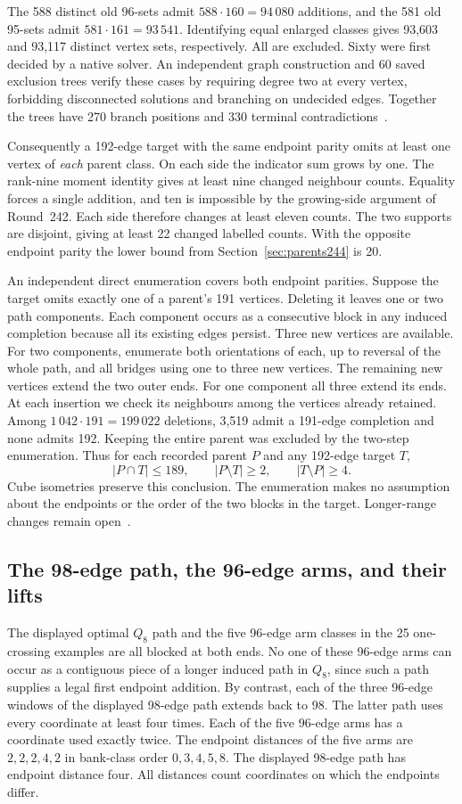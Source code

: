\documentclass[11pt,a4paper]{article}
\theoremstyle{definition}
\theoremstyle{remark}
\begin{document}
The 588 distinct old 96-sets admit $588\cdot160=94\,080$ additions,
and the 581 old 95-sets admit $581\cdot161=93\,541$. Identifying equal
enlarged classes gives 93,603 and 93,117 distinct vertex sets,
respectively. All are excluded. Sixty were first decided by a native
solver. An independent graph construction and 60 saved exclusion
trees verify these cases by requiring degree two at every vertex,
forbidding disconnected solutions and branching on undecided edges.
Together the trees have 270 branch positions and 330 terminal
contradictions~\cite{free245}.

Consequently a 192-edge target with the same endpoint parity omits
at least one vertex of \emph{each} parent class. On each side the
indicator sum grows by one. The rank-nine moment identity gives at
least nine changed neighbour counts. Equality forces a single
addition, and ten is impossible by the growing-side argument of
Round~242. Each side therefore changes at least eleven counts. The
two supports are disjoint, giving at least 22 changed labelled
counts. With the opposite endpoint parity the lower bound from
Section~\ref{sec:parents244} is 20.

An independent direct enumeration covers both endpoint parities.
Suppose the target omits exactly one of a parent's 191 vertices.
Deleting it leaves one or two path components. Each component occurs
as a consecutive block in any induced completion because all its
existing edges persist. Three new vertices are available. For two
components, enumerate both orientations of each, up to reversal of
the whole path, and all bridges using one to three new vertices.
The remaining new vertices extend the two outer ends. For one component
all three extend its ends. At each insertion we check its neighbours
among the vertices already retained. Among $1\,042\cdot191=199\,022$
deletions, 3,519 admit a 191-edge completion and none admits 192.
Keeping the entire parent was excluded by the two-step enumeration.
Thus for each recorded parent $P$ and any 192-edge target $T$,
\[
 |P\cap T|\le189,\qquad |P\setminus T|\ge2,\qquad |T\setminus P|\ge4.
\]
Cube isometries preserve this conclusion. The enumeration makes no
assumption about the endpoints or the order of the two blocks in
the target. Longer-range changes remain open~\cite{free245}.

\subsection{The 98-edge path, the 96-edge arms, and their lifts}\label{sec:q8parents246}
The displayed optimal $Q_8$ path and the five 96-edge arm classes in
the 25 one-crossing examples are all blocked at both ends. No one of
these 96-edge arms can occur as a contiguous piece of a longer induced
path in $Q_8$, since such a path supplies a legal first endpoint
addition. By contrast, each of the three 96-edge windows of the
displayed 98-edge path extends back to 98. The latter path uses every
coordinate at least four times. Each of the five 96-edge arms has a
coordinate used exactly twice. The endpoint distances of the five
arms are $2,2,2,4,2$ in bank-class order $0,3,4,5,8$. The displayed
98-edge path has endpoint distance four. All distances count
coordinates on which the endpoints differ.
\end{document}

